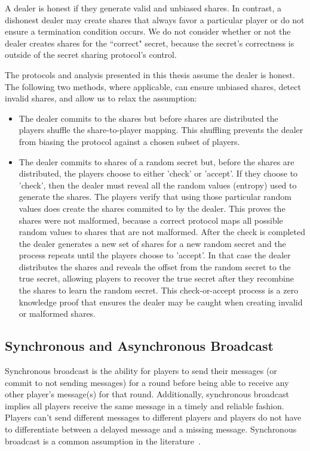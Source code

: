 \documentclass[12pt]{dalcsthesis}
\begin{document}
A dealer is honest if they generate valid and unbiased shares. In contrast, a dishonest dealer may create shares that always favor a particular player or do not ensure a termination condition occurs. We do not consider whether or not the dealer creates shares for the ``correct" secret, because the secret's correctness is outside of the secret sharing protocol's control.

The protocols and analysis presented in this thesis assume the dealer is honest. The following two methods, where applicable, can ensure unbiased shares, detect invalid shares, and allow us to relax the assumption:

\begin{itemize}
  \item The dealer commits to the shares but before shares are distributed the players shuffle the share-to-player mapping. This shuffling prevents the dealer from biasing the protocol against a chosen subset of players.  
  \item The dealer commits to shares of a random secret but, before the shares are distributed, the players choose to either 'check' or 'accept'. If they choose to 'check', then the dealer must reveal all the random values (entropy) used to generate the shares. The players verify that using those particular random values does create the shares commited to by the dealer. This proves the shares were not malformed, because a correct protocol maps all possible random values to shares that are not malformed. After the check is completed the dealer generates a new set of shares for a new random secret and the process repeats until the players choose to 'accept'. In that case the dealer distributes the shares and reveals the offset from the random secret to the true secret, allowing players to recover the true secret after they recombine the shares to learn the random secret. This check-or-accept process is a zero knowledge proof that ensures the dealer may be caught when creating invalid or malformed shares. 
\end{itemize}

\subsection{Synchronous and Asynchronous Broadcast}
\label{Def:Broadcast}

Synchronous broadcast is the ability for players to send their messages (or commit to not sending messages) for a round before being able to receive any other player's message(s) for that round. Additionally, synchronous broadcast implies all players receive the same message in a timely and reliable fashion. Players can't send different messages to different players and players do not have to differentiate between a delayed message and a missing message. Synchronous broadcast is a common assumption in the literature~\cite{fuch10, gordon06, halpern04, kol08-2, kol08, maleka08, ong09}.
\end{document}
